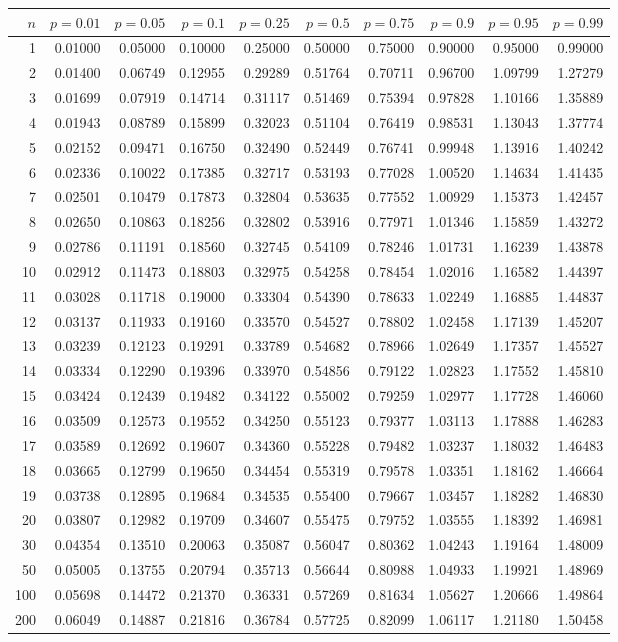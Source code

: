 %
%
%

\begin{table}[ht]
\small
\begin{center}
\begin{tabular}{|r|rrr|rrr|rrr|}
\hline
$n$&$p=0.01$&$p=0.05$&$p=0.1$&$p=0.25$&$p=0.5$&$p=0.75$&$p=0.9$&$p=0.95$&$p=0.99$\\
\hline
1&0.01000&0.05000&0.10000&0.25000&0.50000&0.75000&0.90000&0.95000&0.99000\\
2&0.01400&0.06749&0.12955&0.29289&0.51764&0.70711&0.96700&1.09799&1.27279\\
3&0.01699&0.07919&0.14714&0.31117&0.51469&0.75394&0.97828&1.10166&1.35889\\
4&0.01943&0.08789&0.15899&0.32023&0.51104&0.76419&0.98531&1.13043&1.37774\\
5&0.02152&0.09471&0.16750&0.32490&0.52449&0.76741&0.99948&1.13916&1.40242\\
6&0.02336&0.10022&0.17385&0.32717&0.53193&0.77028&1.00520&1.14634&1.41435\\
7&0.02501&0.10479&0.17873&0.32804&0.53635&0.77552&1.00929&1.15373&1.42457\\
8&0.02650&0.10863&0.18256&0.32802&0.53916&0.77971&1.01346&1.15859&1.43272\\
9&0.02786&0.11191&0.18560&0.32745&0.54109&0.78246&1.01731&1.16239&1.43878\\
10&0.02912&0.11473&0.18803&0.32975&0.54258&0.78454&1.02016&1.16582&1.44397\\
11&0.03028&0.11718&0.19000&0.33304&0.54390&0.78633&1.02249&1.16885&1.44837\\
12&0.03137&0.11933&0.19160&0.33570&0.54527&0.78802&1.02458&1.17139&1.45207\\
13&0.03239&0.12123&0.19291&0.33789&0.54682&0.78966&1.02649&1.17357&1.45527\\
14&0.03334&0.12290&0.19396&0.33970&0.54856&0.79122&1.02823&1.17552&1.45810\\
15&0.03424&0.12439&0.19482&0.34122&0.55002&0.79259&1.02977&1.17728&1.46060\\
16&0.03509&0.12573&0.19552&0.34250&0.55123&0.79377&1.03113&1.17888&1.46283\\
17&0.03589&0.12692&0.19607&0.34360&0.55228&0.79482&1.03237&1.18032&1.46483\\
18&0.03665&0.12799&0.19650&0.34454&0.55319&0.79578&1.03351&1.18162&1.46664\\
19&0.03738&0.12895&0.19684&0.34535&0.55400&0.79667&1.03457&1.18282&1.46830\\
20&0.03807&0.12982&0.19709&0.34607&0.55475&0.79752&1.03555&1.18392&1.46981\\
30&0.04354&0.13510&0.20063&0.35087&0.56047&0.80362&1.04243&1.19164&1.48009\\
50&0.05005&0.13755&0.20794&0.35713&0.56644&0.80988&1.04933&1.19921&1.48969\\
100&0.05698&0.14472&0.21370&0.36331&0.57269&0.81634&1.05627&1.20666&1.49864\\
200&0.06049&0.14887&0.21816&0.36784&0.57725&0.82099&1.06117&1.21180&1.50458\\


\end{tabular}
\end{center}
\end{table}
